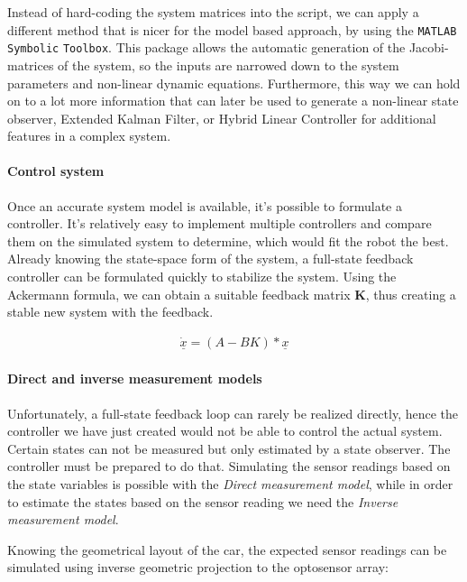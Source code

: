 Instead of hard-coding the system matrices into the script, we can apply a different method that is nicer for the model based approach, by using the \verb!MATLAB! \verb!Symbolic! \verb!Toolbox!. This package allows the automatic generation of the Jacobi-matrices of the system, so the inputs are narrowed down to the system parameters and non-linear dynamic equations.
Furthermore, this way we can hold on to a lot more information that can later be used to generate a non-linear state observer, Extended Kalman Filter\cite{ekf}, or Hybrid Linear Controller for additional features in a complex system\cite{hybrid}.
     


\paragraph{Control system}

Once an accurate system model is available, it's possible to formulate a controller. It's relatively easy to implement multiple controllers and compare them on the simulated system to determine, which would fit the robot the best.
Already knowing the state-space form of the system, a full-state feedback controller can be formulated quickly to stabilize the system. Using the Ackermann formula, we can obtain a suitable feedback matrix \textbf{K}, thus creating a stable new system with the feedback.

\begin{align}
	\underline{\dot{x}} = (A - BK)*\underline{x}
\end{align}

\paragraph{Direct and inverse measurement models}

Unfortunately, a full-state feedback loop can rarely be realized directly, hence the controller we have just created would not be able to control the actual system. Certain states can not be measured but only estimated by a state observer. The controller must be prepared to do that. Simulating the sensor readings based on the state variables is possible with the \emph{Direct measurement model}, while in order to estimate the states based on the sensor reading we need the \emph{Inverse measurement model}.

Knowing the geometrical layout of the car, the expected sensor readings can be simulated using inverse geometric projection to the optosensor array:

